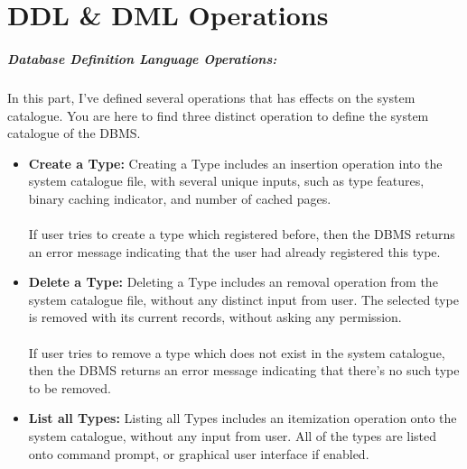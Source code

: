 \documentclass[12pt]{report}
\begin{document}
\chapter{DDL \& DML Operations}

\paragraph{Database Definition Language Operations:}
In this part, I've defined several operations that has effects on the system catalogue. You are here to find three distinct operation to define the system catalogue of the DBMS.

\begin{itemize}
\item \textbf{Create a Type:} Creating a Type includes an insertion operation into the system catalogue file, with several unique inputs, such as type features, binary caching indicator, and number of cached pages. \\\\
If user tries to create a type which registered before, then the DBMS returns an error message indicating that the user had already registered this type.
\item \textbf{Delete a Type:} Deleting a Type includes an removal operation from the system catalogue file, without any distinct input from user. The selected type is removed with its current records, without asking any permission. \\\\
If user tries to remove a type which does not exist in the system catalogue, then the DBMS returns an error message indicating that there's no such type to be removed.
\item \textbf{List all Types:} Listing all Types includes an itemization operation onto the system catalogue, without any input from user. All of the types are listed onto command prompt, or graphical user interface if enabled.
\end{itemize}

\vspace{5cm}
\end{document}
